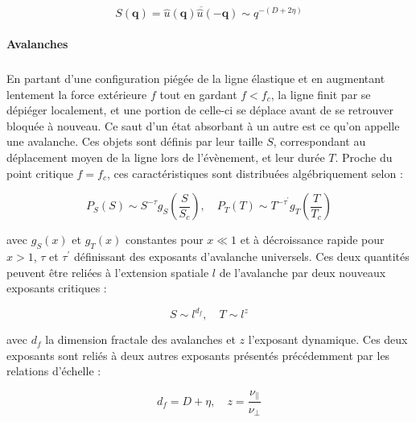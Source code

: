 \begin{equation}
	S(\mathbf{q}) = \overline{\hat{u}(\mathbf{q})\hat{u}(-\mathbf{q})} \sim q^{-(D+2\eta)}
\end{equation}

\paragraph{Avalanches}

\subparagraph{}En partant d'une configuration piégée de la ligne élastique et en augmentant lentement la force extérieure $f$ tout en gardant $f<f_c$, la ligne finit par se dépiéger localement, et une portion de celle-ci se déplace avant de se retrouver bloquée à nouveau. Ce saut d'un état absorbant à un autre est ce qu'on appelle une avalanche. Ces objets sont définis par leur taille $S$, correspondant au déplacement moyen de la ligne lors de l'évènement, et leur durée $T$. Proche du point critique $f=f_c$, ces caractéristiques sont distribuées algébriquement selon \cite{narayan_threshold_1993, rosso_avalanche_size_2009, le_doussal_statistics_2009, le_doussal_size_2009, wiese_theory_2022} :

\begin{equation}
P_S(S) \sim S^{-\tau}g_S\left( \frac{S}{S_c} \right), \quad P_T(T) \sim T^{-\tau^\prime}g_T\left( \frac{T}{T_c} \right)
\end{equation}

\noindent avec $g_S(x)$ et $g_T(x)$ constantes pour $x\ll 1$ et à décroissance rapide pour $x>1$, $\tau$ et $\tau^\prime$ définissant des exposants d'avalanche universels. Ces deux quantités peuvent être reliées à l'extension spatiale $l$ de l'avalanche par deux nouveaux exposants critiques :

\begin{equation}
	S \sim l^{d_f}, \quad T \sim l^z
\end{equation}

\noindent avec $d_f$ la dimension fractale des avalanches et $z$ l'exposant dynamique. Ces deux exposants sont reliés à deux autres exposants présentés précédemment par les relations d'échelle :

\begin{equation}
	d_f = D + \eta, \quad z = \frac{\nu_\parallel}{\nu_\perp}
\end{equation}

